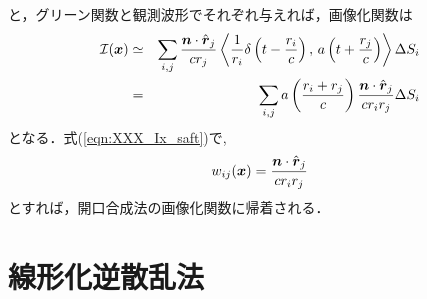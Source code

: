 と，グリーン関数と観測波形でそれぞれ与えれば，画像化関数は
\begin{eqnarray}
	{\cal I}(\mbox{\boldmath $x$})
	&\simeq & 
	\sum_{i,j}
	\frac{\mbox{\boldmath $n$}\cdot\hat{\mbox{\boldmath $r$}}_j}{cr_j}
	\left<
		\frac{1}{r_i}\delta\left( t-\frac{r_i}{c}\right)
		,\, 
		a\left(t+\frac{r_j}{c}\right)
	\right>
	\Delta S_i \\ 
	&=&
	\sum_{i,j}
	a\left(\frac{r_i+r_j}{c}\right)
	\frac{\mbox{\boldmath $n$}\cdot\hat{\mbox{\boldmath $r$}}_j}{cr_i r_j} 
	\Delta S_i 
	\label{eqn:XXX_Ix_saft}
\end{eqnarray}
となる．式(\ref{eqn:XXX_Ix_saft})で,
\begin{equation}
	w_{ij}(\mbox{\boldmath $x$})=\frac{\mbox{\boldmath $n$}\cdot\hat{\mbox{\boldmath $r$}}_j}{cr_i r_j} 
	\label{eqn:}
\end{equation}
とすれば，開口合成法の画像化関数に帰着される．








\section{線形化逆散乱法}

